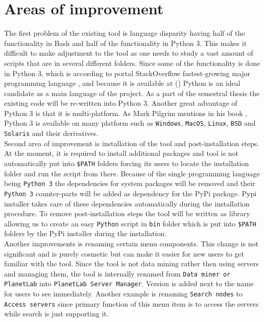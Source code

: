 \section{Areas of improvement}
The first problem of the existing tool is language disparity having half of the functionality in Bash and half of the functionality in Python 3. This makes it difficult to make adjustment to the tool as one needs to study a vast amount of scripts that are in several different folders. Since some of the functionality is done in Python 3, which is according to portal StackOverflow fastest-growing major programming language \cite{pythonfastestgrowing}, and because it is available at  () Python is an ideal candidate as a main language of the project. As a part of the semestral thesis the existing code will be re-written into Python 3. Another great advantage of Python 3 is that it is multi-platform. As Mark Pilgrim mentions in his book \cite{Pilgrimc2010}, Python 3 is available on many platform such as \texttt{Windows}, \texttt{MacOS}, \texttt{Linux}, \texttt{BSD} and \texttt{Solaris} and their derivatives.\\
Second area of improvement is installation of the tool and post-installation steps. At the moment, it is required to install additional packages and tool is not automatically put into \texttt{\$PATH} folders forcing its users to locate the installation folder and run the script from there. Because of the single programming language being \texttt{Python 3} the dependencies for system packages will be removed and their \texttt{Python 3} counter-parts will be added as dependency for the PyPi package. Pypi installer takes care of these dependencies automatically during the installation procedure. To remove post-installation steps the tool will be written as library allowing us to create an easy \texttt{Python} script in \texttt{bin} folder which is put into \texttt{\$PATH} folders by the PyPi installer during the installation.\\
Another improvements is renaming certain menu components. This change is not significant and is purely cosmetic but can make it easier for new users to get familiar with the tool. Since the tool is not data mining rather then using servers and managing them, the tool is internally renamed from \texttt{Data miner or PlanetLab} into \texttt{PlanetLab Server Manager}. Version is added next to the name for users to see immediately. Another example is renaming \texttt{Search nodes} to \texttt{Access servers} since primary function of this menu item is to access the servers while search is just supporting it.\\
